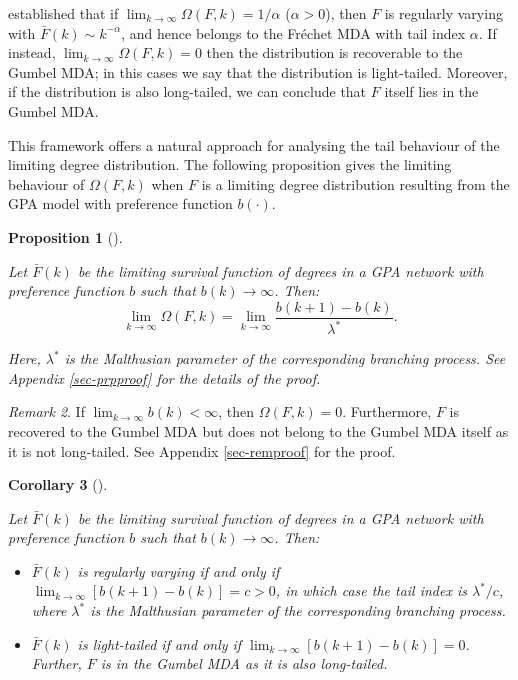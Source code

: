 \documentclass[
  sn-basic,
  10pt,
]{sn-jnl}
\theoremstyle{thmstyleone}
\newtheorem{proposition}{Proposition}[section]
\theoremstyle{thmstyleone}
\newtheorem{corollary}[proposition]{Corollary}
\theoremstyle{remark}
\newtheorem{refremark}[proposition]{Remark}
\theoremstyle{plain}
\theoremstyle{plain}
\theoremstyle{remark}
\begin{document}
\citet{shimura12} established that if
\(\lim_{k\rightarrow\infty} \Omega(F,k) = 1/\alpha\) (\(\alpha>0\)),
then \(F\) is regularly varying with \(\bar F(k) \sim k^{-\alpha}\), and
hence belongs to the Fréchet MDA with tail index \(\alpha\). If instead,
\(\lim_{k\rightarrow\infty} \Omega(F,k) = 0\) then the distribution is
recoverable to the Gumbel MDA; in this cases we say that the
distribution is light-tailed. Moreover, if the distribution is also
long-tailed, we can conclude that \(F\) itself lies in the Gumbel MDA.

This framework offers a natural approach for analysing the tail
behaviour of the limiting degree distribution. The following proposition
gives the limiting behaviour of \(\Omega(F,k)\) when \(F\) is a limiting
degree distribution resulting from the GPA model with preference
function \(b(\cdot)\).

\begin{proposition}[]\protect\hypertarget{prp-omega}{}\label{prp-omega}

Let \(\bar F (k)\) be the limiting survival function of degrees in a GPA
network with preference function \(b\) such that
\(b(k)\rightarrow\infty\). Then: \[
\lim_{k\rightarrow\infty}\Omega(F,k) = \lim_{k\rightarrow\infty}\frac{b(k+1)-b(k)}{\lambda^*}.
\]

Here, \(\lambda^*\) is the Malthusian parameter of the corresponding
branching process. See Appendix \ref{sec-prpproof} for the details of
the proof.

\end{proposition}

\begin{refremark}
If \(\lim_{k\rightarrow\infty}b(k)<\infty\), then \(\Omega(F, k) = 0\).
Furthermore, \(F\) is recovered to the Gumbel MDA but does not belong to
the Gumbel MDA itself as it is not long-tailed. See Appendix
\ref{sec-remproof} for the proof.

\label{rem-omega}

\end{refremark}

\begin{corollary}[]\protect\hypertarget{cor-omega2}{}\label{cor-omega2}

Let \(\bar F (k)\) be the limiting survival function of degrees in a GPA
network with preference function \(b\) such that
\(b(k)\rightarrow\infty\). Then:

\begin{itemize}
\item
  \(\bar F(k)\) is regularly varying if and only if
  \(\lim_{k\rightarrow\infty}[b(k+1)-b(k)]=c>0\), in which case the tail
  index is \(\lambda^*/c\), where \(\lambda^*\) is the Malthusian
  parameter of the corresponding branching process.
\item
  \(\bar F(k)\) is light-tailed if and only if
  \(\lim_{k\rightarrow\infty}[b(k+1)-b(k)]=0\). Further, \(F\) is in the
  Gumbel MDA as it is also long-tailed.
\end{itemize}

\end{corollary}
\end{document}
